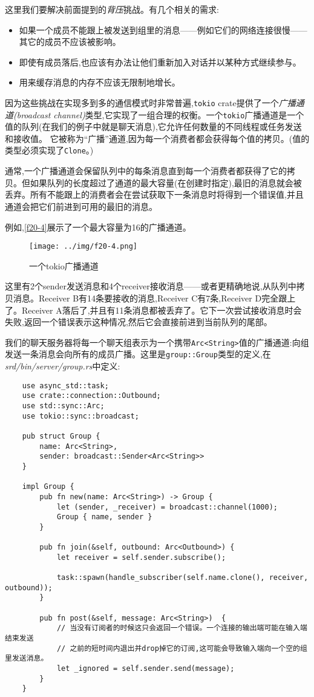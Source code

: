 这里我们要解决前面提到的\emph{背压}挑战。有几个相关的需求:
\begin{itemize}
    \item 如果一个成员不能跟上被发送到组里的消息——例如它们的网络连接很慢——其它的成员不应该被影响。
    \item 即使有成员落后,也应该有办法让他们重新加入对话并以某种方式继续参与。
    \item 用来缓存消息的内存不应该无限制地增长。
\end{itemize}

因为这些挑战在实现多到多的通信模式时非常普遍,\texttt{tokio} crate提供了一个\emph{广播通道(broadcast channel)}类型,它实现了一组合理的权衡。一个\texttt{tokio}广播通道是一个值的队列(在我们的例子中就是聊天消息),它允许任何数量的不同线程或任务发送和接收值。 它被称为“广播”通道,因为每一个消费者都会获得每个值的拷贝。(值的类型必须实现了\texttt{Clone}。)

通常,一个广播通道会保留队列中的每条消息直到每一个消费者都获得了它的拷贝。但如果队列的长度超过了通道的最大容量(在创建时指定),最旧的消息就会被丢弃。所有不能跟上的消费者会在尝试获取下一条消息时将得到一个错误值,并且通道会把它们前进到可用的最旧的消息。

例如,\autoref{f20-4}展示了一个最大容量为16的广播通道。
\begin{figure}[htbp]
    \centering
    \texttt{[image: ../img/f20-4.png]}
    \caption{一个tokio广播通道}
    \label{f20-4}
\end{figure}

这里有2个sender发送消息和4个receiver接收消息——或者更精确地说,从队列中拷贝消息。Receiver B有14条要接收的消息,Receiver C有7条,Receiver D完全跟上了。Receiver A落后了,并且有11条消息都被丢弃了。它下一次尝试接收消息时会失败,返回一个错误表示这种情况,然后它会直接前进到当前队列的尾部。

我们的聊天服务器将每一个聊天组表示为一个携带\texttt{Arc<String>}值的广播通道:向组发送一条消息会向所有的成员广播。这里是\texttt{group::Group}类型的定义,在\emph{srd/bin/server/group.rs}中定义:
\begin{verbatim}
    use async_std::task;
    use crate::connection::Outbound;
    use std::sync::Arc;
    use tokio::sync::broadcast;

    pub struct Group {
        name: Arc<String>,
        sender: broadcast::Sender<Arc<String>>
    }

    impl Group {
        pub fn new(name: Arc<String>) -> Group {
            let (sender, _receiver) = broadcast::channel(1000);
            Group { name, sender }
        }

        pub fn join(&self, outbound: Arc<Outbound>) {
            let receiver = self.sender.subscribe();

            task::spawn(handle_subscriber(self.name.clone(), receiver, outbound));
        }

        pub fn post(&self, message: Arc<String>)  {
            // 当没有订阅者的时候这只会返回一个错误。一个连接的输出端可能在输入端结束发送
            // 之前的短时间内退出并drop掉它的订阅,这可能会导致输入端向一个空的组里发送消息。
            let _ignored = self.sender.send(message);
        }
    }
\end{verbatim}

